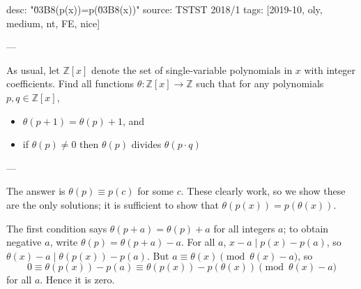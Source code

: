 desc: "\u03B8(p(x))=p(\u03B8(x))"
source: TSTST 2018/1
tags: [2019-10, oly, medium, nt, FE, nice]

---

As usual, let $\mathbb Z[x]$ denote the set of single-variable polynomials in $x$ with integer coefficients. Find all functions $\theta:\mathbb Z[x]\to\mathbb Z$ such that for any polynomials $p,q\in\mathbb Z[x]$,
\begin{itemize}[itemsep=0em]
    \item $\theta(p+1)=\theta(p)+1$, and
    \item if $\theta(p)\ne0$ then $\theta(p)$ divides $\theta(p\cdot q)$
\end{itemize}

---

The answer is $\theta(p)\equiv p(c)$ for some $c$. These clearly work, so we show these are the only solutions; it is sufficient to show that $\theta(p(x))=p(\theta(x))$.

The first condition says $\theta(p+a)=\theta(p)+a$ for all integers $a$; to obtain negative $a$, write $\theta(p)=\theta(p+a)-a$. For all $a$, $x-a\mid p(x)-p(a)$, so $\theta(x)-a\mid\theta(p(x))-p(a)$. But $a\equiv\theta(x)\pmod{\theta(x)-a}$, so \[0\equiv\theta(p(x))-p(a)\equiv\theta(p(x))-p(\theta(x))\pmod{\theta(x)-a}\]
for all $a$. Hence it is zero.
